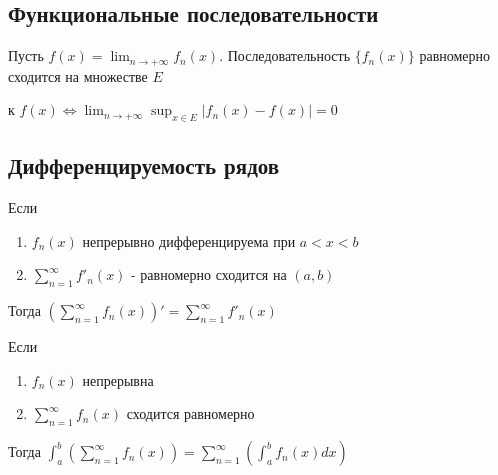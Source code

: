 \documentclass[a4paper]{article}
\begin{document}
\subsection*{Функциональные последовательности}

\begin{hproof}
Пусть  $f(x) = \lim_{n \rightarrow + \infty} f_n(x)$.
Последовательность $\{ f_n(x) \}$ равномерно сходится на множестве $E$ 

к $f(x) \Leftrightarrow \lim_{n \rightarrow +\infty} \sup_{x \in E} |f_n(x) - f(x)| = 0$
\end{hproof}

\subsection*{Дифференцируемость рядов}

\begin{htheorem}
Если
\begin{enumerate}
\item $f_n(x)$ непрерывно дифференцируема при $a < x < b$
\item $\sum_{n=1}^\infty f'_n(x)$ - равномерно сходится на $(a,b)$
\end{enumerate}
Тогда $\left( \sum_{n=1}^\infty f_n(x) \right)' = \sum_{n=1}^\infty f'_n(x)$
\end{htheorem}

\begin{htheorem}
Если 
\begin{enumerate}
\item $f_n(x)$ непрерывна
\item $\sum_{n=1}^\infty f_n(x)$ сходится равномерно
\end{enumerate}
Тогда $\int_a^b \left( \sum_{n=1}^\infty f_n(x) \right) = \sum_{n=1}^\infty \left( \int_a^b f_n(x) dx \right)$
\end{htheorem}
\end{document}
